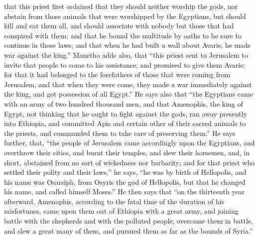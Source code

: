 that this priest first ordained that they should neither worship the gods,
nor abstain from those animals that were worshipped by the Egyptians, but
should kill and eat them all, and should associate with nobody but those
that had conspired with them; and that he bound the multitude by oaths to
be sure to continue in those laws; and that when he had built a wall about
Avaris, he made war against the king.'' Manetho adds also, that ``this
priest sent to Jerusalem to invite that people to come to his assistance,
and promised to give them Avaris; for that it had belonged to the
forefathers of those that were coming from Jerusalem, and that when they
were come, they made a war immediately against the king, and got
possession of all Egypt.'' He says also that ``the Egyptians came with an
army of two hundred thousand men, and that Amenophis, the king of Egypt,
not thinking that he ought to fight against the gods, ran away presently
into Ethiopia, and committed Apis and certain other of their sacred
animals to the priests, and commanded them to take care of preserving
them.'' He says further, that, ``the people of Jerusalem came accordingly
upon the Egyptians, and overthrew their cities, and burnt their temples,
and slew their horsemen, and, in short, abstained from no sort of
wickedness nor barbarity; and for that priest who settled their polity and
their laws,'' he says, ``he was by birth of Hellopolis, and his name was
Osarsiph, from Osyris the god of Hellopolis, but that he changed his name,
and called himself Moses.'' He then says that ``on the thirteenth year
afterward, Amenophis, according to the fatal time of the duration of his
misfortunes, came upon them out of Ethiopia with a great army, and joining
battle with the shepherds and with the polluted people, overcame them in
battle, and slew a great many of them, and pursued them as far as the
bounds of Syria.''

